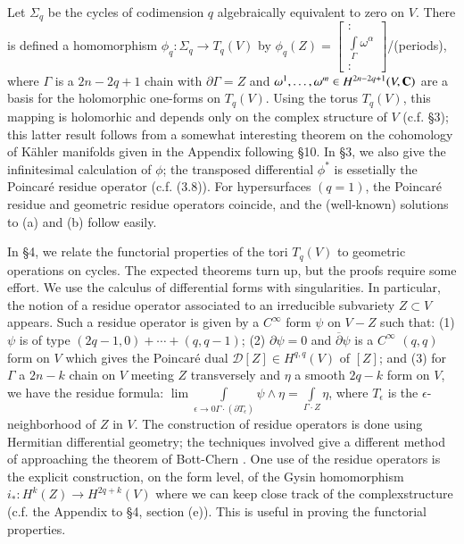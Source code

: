 Let $\Sigma_{q}$ be the cycles of codimension $q$ algebraically equivalent to zero on $V$. There is defined a homomorphism $\phi_{q}:\Sigma_{q}\to T_{q}(V)$ by $\phi_{q}(Z)=\left[\begin{smallmatrix}:\\ \int\limits_{\Gamma}\omega^{\alpha}\\ :\end{smallmatrix}\right]$/(periods), where $\Gamma$ is a $2n-2q+1$ chain with $\partial \Gamma=Z$ and $\omega^{1},\ldots,\omega^{m}\in H^{2n-2q+1}(V,\mathbf{C})$ are a basis for the holomorphic one-forms on $T_{q}(V)$. Using the torus $T_{q}(V)$, this mapping is holomorhic and depends only on the complex structure of $V$ (c.f. \S3); this latter result follows from a somewhat interesting theorem on the cohomology of K\"ahler manifolds given in the Appendix following \S10. In \S3, we also give the infinitesimal calculation of $\phi$; the transposed differential $\phi^{*}$ is essetially the Poincar\'e residue operator (c.f. (3.8)). For hypersurfaces $(q=1)$, the Poincar\'e residue and geometric residue operators coincide, and the (well-known) solutions to (a) and (b) follow easily.

In \S4, we relate the functorial properties of the tori $T_{q}(V)$ to geometric operations on cycles. The expected theorems turn up, but the proofs require some effort. We use the calculus of differential forms with singularities. In particular, the notion of a residue operator associated to an irreducible subvariety $Z\subset V$ appears. Such a residue operator is given by a $C^{\infty}$ form $\psi$ on $V-Z$ such that: (1) $\psi$ is of type $(2q-1,0)+\cdots+(q,q-1)$; (2) $\partial \psi=0$ and $\overline{\partial}\psi$ is a $C^{\infty}$ $(q,q)$ form on $V$ which gives the Poincar\'e dual $\mathscr{D}[Z]\in H^{q,q}(V)$ of $[Z]$; and (3) for $\Gamma$ a $2n-k$ chain on $V$ meeting $Z$ transversely and $\eta$ a smooth $2q-k$ form on $V$, we have the residue formula: $\lim \int\limits_{\epsilon\to 0\Gamma\cdot (\partial T_{\epsilon})}\psi \wedge \eta=\int\limits_{\Gamma\cdot Z}\eta$, where $T_{\epsilon}$ is the $\epsilon$-neighborhood of $Z$ in $V$. The construction of residue operators is done using Hermitian differential geometry; the techniques involved give a different method of approaching the theorem of Bott-Chern \cite{art08-key4}. One use of the residue operators is the explicit construction, on the form level, of the Gysin homomorphism $i_{*}:H^{k}(Z)\to H^{2q+k}(V)$ where we can keep close track of the complex\pageoriginale structure (c.f. the Appendix to \S4, section (e)). This is useful in proving the functorial properties.

